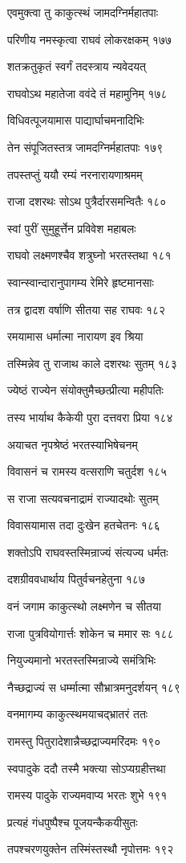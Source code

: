 एवमुक्त्वा तु काकुत्स्थं जामदग्निर्महातपाः

परिणीय नमस्कृत्वा राघवं लोकरक्षकम् १७७

शतक्रतुकृतं स्वर्गं तदस्त्राय न्यवेदयत्

राघवोऽथ महातेजा ववंदे तं महामुनिम् १७८

विधिवत्पूजयामास पाद्यार्घाचमनादिभिः

तेन संपूजितस्तत्र जामदग्निर्महातपाः १७९

तपस्तप्तुं ययौ रम्यं नरनारायणाश्रमम्

राजा दशरथः सोऽथ पुत्रैर्दारसमन्वितैः १८०

स्वां पुरीं सुमुहूर्त्तेन प्रविवेश महाबलः

राघवो लक्ष्मणश्चैव शत्रुघ्नो भरतस्तथा १८१

स्वान्स्वान्दारानुपागम्य रेमिरे हृष्टमानसाः

तत्र द्वादश वर्षाणि सीतया सह राघवः १८२

रमयामास धर्मात्मा नारायण इव श्रिया

तस्मिन्नेव तु राजाथ काले दशरथः सुतम् १८३

ज्येष्ठं राज्येन संयोक्तुमैच्छत्प्रीत्या महीपतिः

तस्य भार्याथ कैकेयी पुरा दत्तवरा प्रिया १८४

अयाचत नृपश्रेष्ठं भरतस्याभिषेचनम्

विवासनं च रामस्य वत्सराणि चतुर्दश १८५

स राजा सत्यवचनाद्रामं राज्यादथोः सुतम्

विवासयामास तदा दुःखेन हतचेतनः १८६

शक्तोऽपि राघवस्तस्मिन्राज्यं संत्यज्य धर्मतः

दशग्रीववधार्थाय पितुर्वचनहेतुना १८७

वनं जगाम काकुत्स्थो लक्ष्मणेन च सीतया

राजा पुत्रवियोगार्त्तः शोकेन च ममार सः १८८

नियुज्यमानो भरतस्तस्मिन्राज्ये समंत्रिभिः

नैच्छद्राज्यं स धर्म्मात्मा सौभ्रात्रमनुदर्शयन् १८९

वनमागम्य काकुत्स्थमयाचद्भ्रातरं ततः

रामस्तु पितुरादेशान्नैच्छद्राज्यमरिंदमः १९०

स्वपादुके ददौ तस्मै भक्त्या सोऽप्यग्रहीत्तथा

रामस्य पादुके राज्यमवाप्य भरतः शुभे १९१

प्रत्यहं गंधपुष्पैश्च पूजयन्कैकयीसुतः

तपश्चरणयुक्तेन तस्मिंस्तस्थौ नृपोत्तमः १९२

